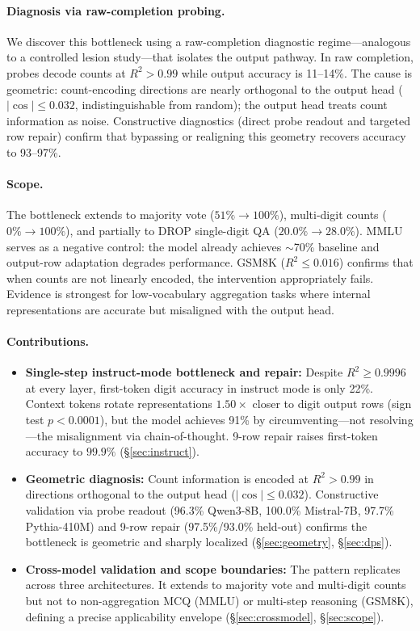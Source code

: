 \documentclass{article}
\begin{document}
\paragraph{Diagnosis via raw-completion probing.}
We discover this bottleneck using a raw-completion diagnostic regime---analogous to a controlled lesion study---that isolates the output pathway.
In raw completion, probes decode counts at $R^2 > 0.99$ while output accuracy is 11--14\%.
The cause is geometric: count-encoding directions are nearly orthogonal to the output head ($|\cos| \leq 0.032$, indistinguishable from random); the output head treats count information as noise.
Constructive diagnostics (direct probe readout and targeted row repair) confirm that bypassing or realigning this geometry recovers accuracy to 93--97\%.

\paragraph{Scope.}
The bottleneck extends to majority vote ($51\% \to 100\%$), multi-digit counts ($0\% \to 100\%$), and partially to DROP single-digit QA ($20.0\% \to 28.0\%$).
MMLU serves as a negative control: the model already achieves $\sim$70\% baseline and output-row adaptation degrades performance.
GSM8K ($R^2 \leq 0.016$) confirms that when counts are not linearly encoded, the intervention appropriately fails.
Evidence is strongest for low-vocabulary aggregation tasks where internal representations are accurate but misaligned with the output head.

\paragraph{Contributions.}
\begin{itemize}
  \item \textbf{Single-step instruct-mode bottleneck and repair:} Despite $R^2 \geq 0.9996$ at every layer, first-token digit accuracy in instruct mode is only 22\%. Context tokens rotate representations $1.50\times$ closer to digit output rows (sign test $p<0.0001$), but the model achieves 91\% by circumventing---not resolving---the misalignment via chain-of-thought. 9-row repair raises first-token accuracy to $99.9\%$ (\S\ref{sec:instruct}).
  \item \textbf{Geometric diagnosis:} Count information is encoded at $R^2 > 0.99$ in directions orthogonal to the output head ($|\cos| \leq 0.032$). Constructive validation via probe readout (96.3\% Qwen3-8B, 100.0\% Mistral-7B, 97.7\% Pythia-410M) and 9-row repair (97.5\%/93.0\% held-out) confirms the bottleneck is geometric and sharply localized (\S\ref{sec:geometry}, \S\ref{sec:dps}).
  \item \textbf{Cross-model validation and scope boundaries:} The pattern replicates across three architectures. It extends to majority vote and multi-digit counts but not to non-aggregation MCQ (MMLU) or multi-step reasoning (GSM8K), defining a precise applicability envelope (\S\ref{sec:crossmodel}, \S\ref{sec:scope}).
\end{itemize}
\end{document}
